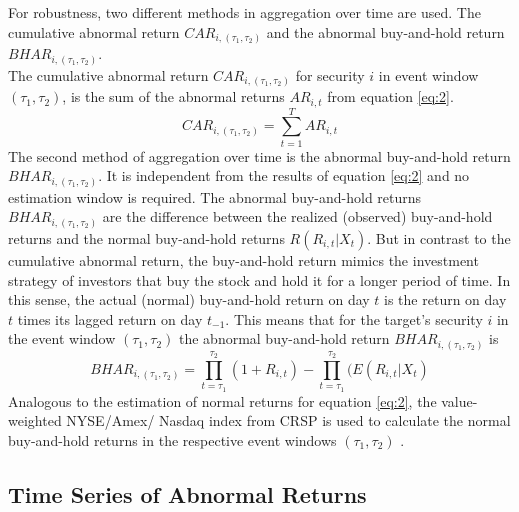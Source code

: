 \documentclass[12pt]{article}
\begin{document}
For robustness, two different methods in aggregation over time are used. The cumulative abnormal return $CAR_{i,(\tau_1,\tau_2)}$ and the abnormal buy-and-hold return $BHAR_{i,(\tau_1,\tau_2)}$.\\
The cumulative abnormal return $CAR_{i,(\tau_1,\tau_2)}$ for security $i$ in event window $(\tau_1,\tau_2)$, is the sum of the abnormal returns $AR_{i,t}$ from equation \eqref{eq:2}.
	\begin{equation}
		CAR_{i,(\tau_1,\tau_2)}=\sum_{t=1}^{T}AR_{i,t}
	\end{equation}
The second method of aggregation over time is the abnormal buy-and-hold return $BHAR_{i,(\tau_1,\tau_2)}$. It is independent from the results of equation \eqref{eq:2} and no estimation window is required. 
The abnormal buy-and-hold returns $BHAR_{i,(\tau_1,\tau_2)}$ are the difference between the realized (observed) buy-and-hold returns and the normal buy-and-hold returns $R(R_{i,t}|X_{t})$.
But in contrast to the cumulative abnormal return, the buy-and-hold return mimics the investment strategy of investors that buy the stock and hold it for a longer period of time. In this sense, the actual (normal) buy-and-hold return on day $t$ is the return on day $t$ times its lagged return on day $t_{-1}$. This means that for the target's security $i$ in the event window $(\tau_1,\tau_2)$ the abnormal buy-and-hold return $BHAR_{i,(\tau_1,\tau_2)}$ is
\begin{equation}
	BHAR_{i,(\tau_1,\tau_2)}=\prod_{t=\tau_1}^{\tau_2}(1+R_{i,t})-\prod_{t=\tau_1}^{\tau_2}(E(R_{i,t}|X_{t})
\end{equation}
Analogous to the estimation of normal returns for equation \eqref{eq:2}, the value-weighted NYSE/Amex/ Nasdaq index from CRSP is used to calculate the normal buy-and-hold returns in the respective event windows $(\tau_1,\tau_2)$ \citep[p.25]{Brav2009}.

\subsection{Time Series of Abnormal Returns}
\end{document}
